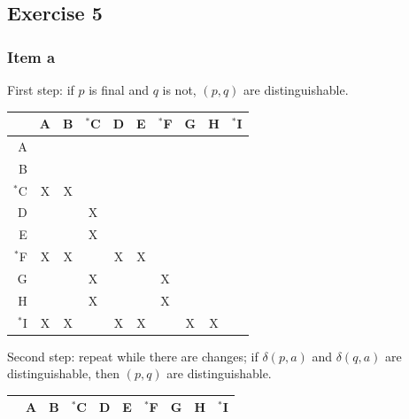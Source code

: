 {\subsection{Exercise 5}
\subsubsection{Item a}
First step: if $p$ is final and $q$ is not, $(p,q)$ are distinguishable.
\begin{center} \begin{tabular}{r || c | c | c | c | c | c | c | c | c}
	   & A  & B  & $^*$C & D  & E  & $^*$F & G  & H  & $^*$I \\ \hline \hline
	A  & \cellcolor{gray} & \cellcolor{gray} & \cellcolor{gray} & \cellcolor{gray} & \cellcolor{gray} & \cellcolor{gray} & \cellcolor{gray} & \cellcolor{gray} & \cellcolor{gray} \\ \hline
	B  &    & \cellcolor{gray} & \cellcolor{gray} & \cellcolor{gray} & \cellcolor{gray} & \cellcolor{gray} & \cellcolor{gray} & \cellcolor{gray} & \cellcolor{gray} \\ \hline
	$^*$C & X  & X  & \cellcolor{gray} & \cellcolor{gray} & \cellcolor{gray} & \cellcolor{gray} & \cellcolor{gray} & \cellcolor{gray} & \cellcolor{gray} \\ \hline
	D  &    &    & X  & \cellcolor{gray} & \cellcolor{gray} & \cellcolor{gray} & \cellcolor{gray} & \cellcolor{gray} & \cellcolor{gray} \\ \hline
	E  &    &    & X  &    & \cellcolor{gray} & \cellcolor{gray} & \cellcolor{gray} & \cellcolor{gray} & \cellcolor{gray} \\ \hline
	$^*$F & X  & X  &    & X  & X  & \cellcolor{gray} & \cellcolor{gray} & \cellcolor{gray} & \cellcolor{gray} \\ \hline
	G  &    &    & X  &    &    & X  & \cellcolor{gray} & \cellcolor{gray} & \cellcolor{gray} \\ \hline
	H  &    &    & X  &    &    & X  &    & \cellcolor{gray} & \cellcolor{gray} \\ \hline
	$^*$I & X  & X  &    & X  & X  &    & X  & X  & \cellcolor{gray} 
\end{tabular} \end{center}
Second step: repeat while there are changes; if $\delta(p,a)$ and $\delta(q,a)$ are distinguishable, then $(p,q)$ are distinguishable.
\begin{center} \begin{tabular}{r || c | c | c | c | c | c | c | c | c}
	   & A  & B  & $^*$C & D  & E  & $^*$F & G  & H  & $^*$I \\ \hline \hline

\end{tabular}
\end{center}}
